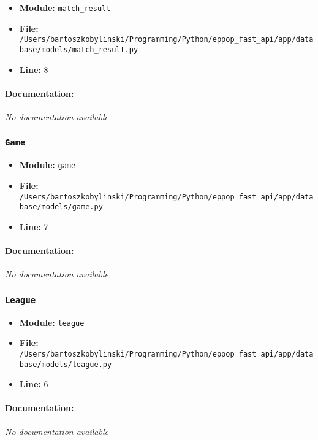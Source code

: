 \documentclass[11pt,a4paper]{article}
\begin{document}
\begin{itemize}
    \item \textbf{Module:} \texttt{match\_result}
    \item \textbf{File:} \texttt{/Users/bartoszkobylinski/Programming/Python/eppop\_fast\_api/app/database/models/match\_result.py}
    \item \textbf{Line:} 8
\end{itemize}

\paragraph{Documentation:} \textit{No documentation available}


\vspace{1em}
\subsubsection{\texttt{Game}}

\begin{itemize}
    \item \textbf{Module:} \texttt{game}
    \item \textbf{File:} \texttt{/Users/bartoszkobylinski/Programming/Python/eppop\_fast\_api/app/database/models/game.py}
    \item \textbf{Line:} 7
\end{itemize}

\paragraph{Documentation:} \textit{No documentation available}


\vspace{1em}
\subsubsection{\texttt{League}}

\begin{itemize}
    \item \textbf{Module:} \texttt{league}
    \item \textbf{File:} \texttt{/Users/bartoszkobylinski/Programming/Python/eppop\_fast\_api/app/database/models/league.py}
    \item \textbf{Line:} 6
\end{itemize}

\paragraph{Documentation:} \textit{No documentation available}
\end{document}
